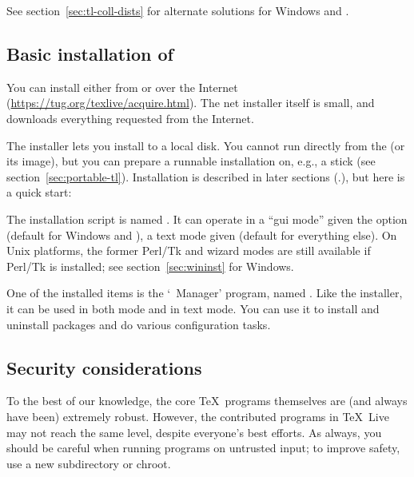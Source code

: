 \documentclass{article}
\begin{document}
See section~\ref{sec:tl-coll-dists} for alternate solutions
for Windows and \MacOSX.

\subsection{Basic installation of \protect\TL{}}
\label{sec:basic}

You can install \TL{} either from \DVD{} or over the Internet
(\url{https://tug.org/texlive/acquire.html}). The net installer itself is
small, and downloads everything requested from the Internet.

The \DVD{} installer lets you install to a local disk.  You cannot run
\TL{} directly from the \TK{} \DVD{} (or its  image), but you
can prepare a runnable installation on, e.g., a \USB{} stick (see
section~\ref{sec:portable-tl}).  Installation is described in later
sections (\p.\pageref{sec:install}), but here is a quick start:

\begin{itemize*}

\item The installation script is named .  It
  can operate in a ``gui mode'' given the option 
  (default for Windows and \MacOSX), a text mode given
   (default for everything else). On Unix
  platforms, the former Perl/Tk and wizard modes are still available
  if Perl/Tk is installed; see section~\ref{sec:wininst} for
  Windows.

\item One of the installed items is the `\TL\ Manager' program,
  named .  Like the installer, it can be used in both \GUI{}
  mode and in text mode. You can use it to install and uninstall
  packages and do various configuration tasks.

\end{itemize*}


\subsection{Security considerations}
\label{sec:security}

To the best of our knowledge, the core \TeX\ programs themselves are
(and always have been) extremely robust.  However, the contributed
programs in \TeX\ Live may not reach the same level, despite everyone's
best efforts.  As always, you should be careful when running programs on
untrusted input; to improve safety, use a new subdirectory or chroot.
\end{document}

